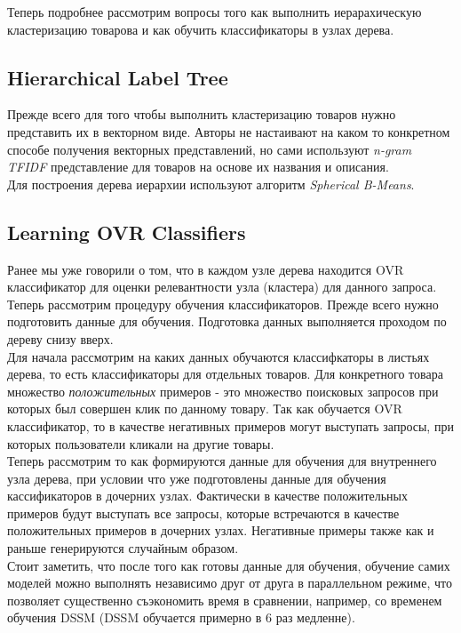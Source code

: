 Теперь подробнее рассмотрим вопросы того как выполнить иерарахическую кластеризацию товарова и как обучить классификаторы в узлах дерева.

\subsection*{Hierarchical Label Tree}

Прежде всего для того чтобы выполнить кластеризацию товаров нужно представить их в векторном виде.
Авторы не настаивают на каком то конкретном способе получения векторных представлений, но сами используют \textit{n-gram TFIDF} представление для товаров на основе их названия и описания. \\

Для построения дерева иерархии используют алгоритм \textit{Spherical B-Means}.

\subsection*{Learning OVR Classifiers}

Ранее мы уже говорили о том, что в каждом узле дерева находится OVR классификатор для оценки релевантности узла (кластера) для данного запроса.
Теперь рассмотрим процедуру обучения классификаторов. 
Прежде всего нужно подготовить данные для обучения. 
Подготовка данных выполняется проходом по дереву снизу вверх.\\

Для начала рассмотрим на каких данных обучаются классифкаторы в листьях дерева, то есть классификаторы для отдельных товаров.
Для конкретного товара множество \textit{положительных} примеров - это множество поисковых запросов при которых был совершен клик по данному товару.
Так как обучается OVR классификатор, то в качестве негативных примеров могут выступать запросы, при которых пользователи кликали на другие товары. \\

Теперь рассмотрим то как формируются данные для обучения для внутреннего узла дерева, при условии что уже подготовлены данные для обучения кассификаторов в дочерних узлах.
Фактически в качестве положительных примеров будут выступать все запросы, которые встречаются в качестве положительных примеров в дочерних узлах.
Негативные примеры также как и раньше генерируются случайным образом. \\

Стоит заметить, что после того как готовы данные для обучения, обучение самих моделей можно выполнять независимо друг от друга в параллельном режиме, что позволяет существенно съэкономить время в сравнении, например, со временем обучения DSSM (DSSM обучается примерно в 6 раз медленне).

